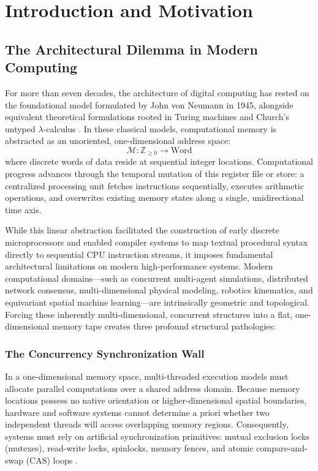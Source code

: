 \chapter{Introduction and Motivation}
\label{ch:intro}

\section{The Architectural Dilemma in Modern Computing}
\label{sec:arch_dilemma}

For more than seven decades, the architecture of digital computing has rested on the foundational model formulated by John von Neumann in 1945, alongside equivalent theoretical formulations rooted in Turing machines and Church's untyped $\lambda$-calculus \cite{turing1937computable, church1936unsolvable}. In these classical models, computational memory is abstracted as an unoriented, one-dimensional address space:
\begin{equation}
    \mathcal{M} : \mathbb{Z}_{\ge 0} \longrightarrow \text{Word}
\end{equation}
where discrete words of data reside at sequential integer locations. Computational progress advances through the temporal mutation of this register file or store: a centralized processing unit fetches instructions sequentially, executes arithmetic operations, and overwrites existing memory states along a single, unidirectional time axis.

While this linear abstraction facilitated the construction of early discrete microprocessors and enabled compiler systems to map textual procedural syntax directly to sequential CPU instruction streams, it imposes fundamental architectural limitations on modern high-performance systems. Modern computational domains---such as concurrent multi-agent simulations, distributed network consensus, multi-dimensional physical modeling, robotics kinematics, and equivariant spatial machine learning---are intrinsically geometric and topological. Forcing these inherently multi-dimensional, concurrent structures into a flat, one-dimensional memory tape creates three profound structural pathologies:

\subsection{The Concurrency Synchronization Wall}
In a one-dimensional memory space, multi-threaded execution models must allocate parallel computations over a shared address domain. Because memory locations possess no native orientation or higher-dimensional spatial boundaries, hardware and software systems cannot determine a priori whether two independent threads will access overlapping memory regions. Consequently, systems must rely on artificial synchronization primitives: mutual exclusion locks (mutexes), read-write locks, spinlocks, memory fences, and atomic compare-and-swap (CAS) loops \cite{dijkstra1965cooperating, lamport1979make, herlihy1990linearizability}.

